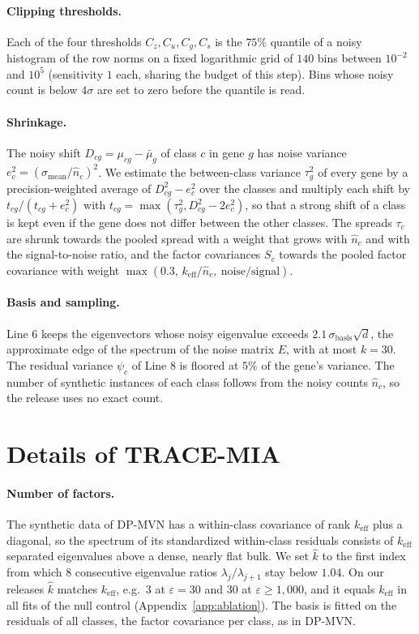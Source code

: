 \documentclass{article}
\newcommand{\dpmvn}{DP-MVN}
\newcommand{\ours}{TRACE-MIA}
\begin{document}
\paragraph{Clipping thresholds.}
Each of the four thresholds $C_z, C_u, C_g, C_s$ is the $75\%$ quantile of a noisy histogram of the row norms on a fixed logarithmic grid of $140$ bins between $10^{-2}$ and $10^{5}$ (sensitivity $1$ each, sharing the budget of this step). Bins whose noisy count is below $4\sigma$ are set to zero before the quantile is read.

\paragraph{Shrinkage.}
The noisy shift $D_{cg}=\mu_{cg}-\bar\mu_g$ of class $c$ in gene $g$ has noise variance $e_c^2=(\sigma_\mathrm{mean}/\hat n_c)^2$. We estimate the between-class variance $\tau_g^2$ of every gene by a precision-weighted average of $D_{cg}^2-e_c^2$ over the classes and multiply each shift by $t_{cg}/(t_{cg}+e_c^2)$ with $t_{cg}=\max(\tau_g^2, D_{cg}^2-2e_c^2)$, so that a strong shift of a class is kept even if the gene does not differ between the other classes. The spreads $\tau_c$ are shrunk towards the pooled spread with a weight that grows with $\hat n_c$ and with the signal-to-noise ratio, and the factor covariances $S_c$ towards the pooled factor covariance with weight $\max(0.3,\, k_\mathrm{eff}/\hat n_c,\ \text{noise}/\text{signal})$.

\paragraph{Basis and sampling.}
Line 6 keeps the eigenvectors whose noisy eigenvalue exceeds $2.1\,\sigma_\mathrm{basis}\sqrt d$, the approximate edge of the spectrum of the noise matrix $E$, with at most $k=30$. The residual variance $\psi_c$ of Line 8 is floored at $5\%$ of the gene's variance. The number of synthetic instances of each class follows from the noisy counts $\hat n_c$, so the release uses no exact count.

\section{Details of \ours{}}
\label{app:attack}

\paragraph{Number of factors.}
The synthetic data of \dpmvn{} has a within-class covariance of rank $k_\mathrm{eff}$ plus a diagonal, so the spectrum of its standardized within-class residuals consists of $k_\mathrm{eff}$ separated eigenvalues above a dense, nearly flat bulk. We set $\hat k$ to the first index from which $8$ consecutive eigenvalue ratios $\lambda_j/\lambda_{j+1}$ stay below $1.04$. On our releases $\hat k$ matches $k_\mathrm{eff}$, e.g.\ $3$ at $\varepsilon=30$ and $30$ at $\varepsilon\ge1{,}000$, and it equals $k_\mathrm{eff}$ in all fits of the null control (Appendix~\ref{app:ablation}). The basis is fitted on the residuals of all classes, the factor covariance per class, as in \dpmvn{}.
\end{document}
